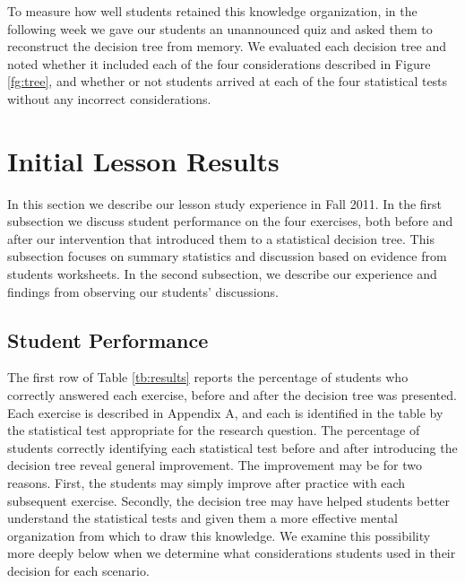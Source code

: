 \documentclass[12pt]{article}
\begin{document}
To measure how well students retained this knowledge organization, in the following week we gave our students an unannounced quiz and asked them to reconstruct the decision tree from memory.  We evaluated each decision tree and noted whether it included each of the four considerations described in Figure \ref{fg:tree}, and whether or not students arrived at each of the four statistical tests without any incorrect considerations.

\section{Initial Lesson Results}
In this section we describe our lesson study experience in Fall 2011.  In the first subsection we discuss student performance on the four exercises, both before and after our intervention that introduced them to a statistical decision tree.  This subsection focuses on summary statistics and discussion based on evidence from students worksheets.  In the second subsection, we describe our experience and findings from observing our students' discussions.

\subsection{Student Performance}
The first row of Table \ref{tb:results} reports the percentage of students who correctly answered each exercise, before and after the decision tree was presented.  Each exercise is described in Appendix A, and each is identified in the table by the statistical test appropriate for the research question.  The percentage of students correctly identifying each statistical test before and after introducing the decision tree reveal general improvement.  The improvement may be for two reasons.  First, the students may simply improve after practice with each subsequent exercise.  Secondly, the decision tree may have helped students better understand the statistical tests and given them a more effective mental organization from which to draw this knowledge.  We examine this possibility more deeply below when we determine what considerations students used in their decision for each scenario.  
\end{document}
